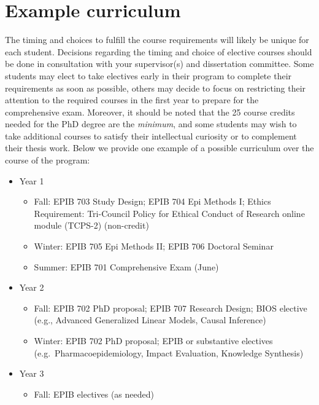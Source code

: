 \documentclass[
]{book}
\providecommand{\tightlist}{%
  \setlength{\itemsep}{0pt}\setlength{\parskip}{0pt}}
\begin{document}
\hypertarget{example-curriculum}{%
\section{Example curriculum}\label{example-curriculum}}

The timing and choices to fulfill the course requirements will likely be unique for each student. Decisions regarding the timing and choice of elective courses should be done in consultation with your supervisor(s) and dissertation committee. Some students may elect to take electives early in their program to complete their requirements as soon as possible, others may decide to focus on restricting their attention to the required courses in the first year to prepare for the comprehensive exam. Moreover, it should be noted that the 25 course credits needed for the PhD degree are the \emph{minimum}, and some students may wish to take additional courses to satisfy their intellectual curiosity or to complement their thesis work. Below we provide one example of a possible curriculum over the course of the program:

\begin{itemize}
\tightlist
\item
  Year 1

  \begin{itemize}
  \tightlist
  \item
    Fall: EPIB 703 Study Design; EPIB 704 Epi Methods I; Ethics Requirement: Tri-Council Policy for Ethical Conduct of Research online module (TCPS-2) (non-credit)\\
  \item
    Winter: EPIB 705 Epi Methods II; EPIB 706 Doctoral Seminar
  \item
    Summer: EPIB 701 Comprehensive Exam (June)
  \end{itemize}
\item
  Year 2

  \begin{itemize}
  \tightlist
  \item
    Fall: EPIB 702 PhD proposal; EPIB 707 Research Design; BIOS elective (e.g., Advanced Generalized Linear Models, Causal Inference)
  \item
    Winter: EPIB 702 PhD proposal; EPIB or substantive electives (e.g.~Pharmacoepidemiology, Impact Evaluation, Knowledge Synthesis)
  \end{itemize}
\item
  Year 3

  \begin{itemize}
  \tightlist
  \item
    Fall: EPIB electives (as needed)
  \end{itemize}
\end{itemize}
\end{document}
